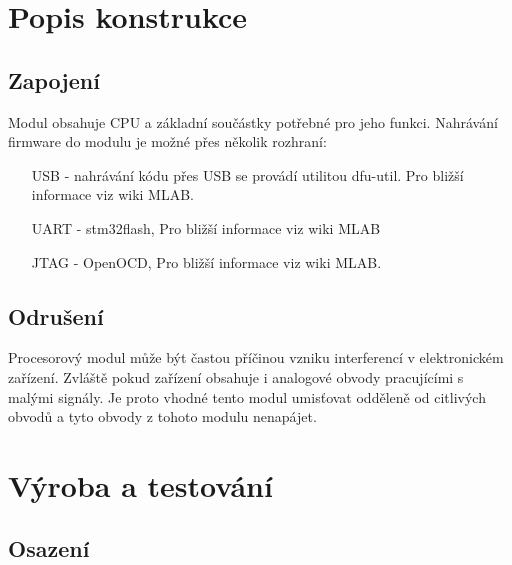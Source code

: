 \documentclass[12pt,a4paper,oneside]{article}
\begin{document}
\newpage
\section{Popis konstrukce}

\subsection{Zapojení}

Modul obsahuje CPU a základní součástky potřebné pro jeho funkci. Nahrávání firmware do modulu je možné přes několik rozhraní:

\begin{itemize}
  \item[USB] - nahrávání kódu přes USB se provádí utilitou dfu-util. Pro bližší informace viz wiki MLAB. 
  \item[UART] - stm32flash, Pro bližší informace viz wiki MLAB
  \item[JTAG] - OpenOCD, Pro bližší informace viz wiki MLAB.
\end{itemize}



\subsection{Odrušení}

Procesorový modul může být častou příčinou vzniku interferencí v elektronickém zařízení. Zvláště pokud zařízení obsahuje i analogové obvody pracujícími s malými signály. Je proto vhodné tento modul umisťovat odděleně od citlivých obvodů a tyto obvody z tohoto modulu nenapájet.

\section{Výroba a testování}

\subsection{Osazení}
\end{document}
